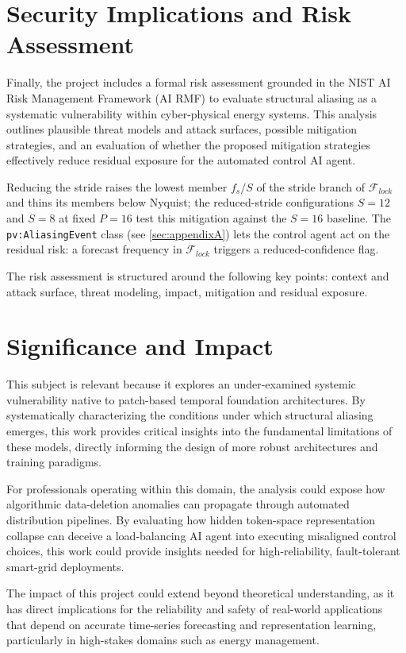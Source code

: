 \section{Security Implications and Risk Assessment}
Finally, the project includes a formal risk assessment grounded in the NIST AI Risk Management Framework (AI RMF)\cite{tabassiArtificialIntelligenceRisk2023} to evaluate structural aliasing as a systematic vulnerability within cyber-physical energy systems. This analysis outlines plausible threat models and attack surfaces, possible mitigation strategies, and an evaluation of whether the proposed mitigation strategies effectively reduce residual exposure for the automated control AI agent. 

Reducing the stride raises the lowest member $f_s/S$ of the stride branch of $\mathcal{F}_{lock}$ and thins its members below Nyquist; the reduced-stride configurations $S=12$ and $S=8$ at fixed $P=16$ test this mitigation against the $S{=}16$ baseline. The \texttt{pv:AliasingEvent} class (see \autoref{sec:appendixA}) lets the control agent act on the residual risk: a forecast frequency in $\mathcal{F}_{lock}$ triggers a reduced-confidence flag.

The risk assessment is structured around the following key points: context and attack surface, threat modeling, impact, mitigation and residual exposure.

\section{Significance and Impact} 
This subject is relevant because it explores an under-examined systemic vulnerability native to patch-based temporal foundation architectures.\cite{paganiPreliminaryInsightsChronos2026} By systematically characterizing the conditions under which structural aliasing emerges, this work provides critical insights into the fundamental limitations of these models, directly informing the design of more robust architectures and training paradigms. 

For professionals operating within this domain, the analysis could expose how algorithmic data-deletion anomalies can propagate through automated distribution pipelines. By evaluating how hidden token-space representation collapse can deceive a load-balancing AI agent into executing misaligned control choices, this work could provide insights needed for high-reliability, fault-tolerant smart-grid deployments.

The impact of this project could extend beyond theoretical understanding, as it has direct implications for the reliability and safety of real-world applications that depend on accurate time-series forecasting and representation learning, particularly in high-stakes domains such as energy management.